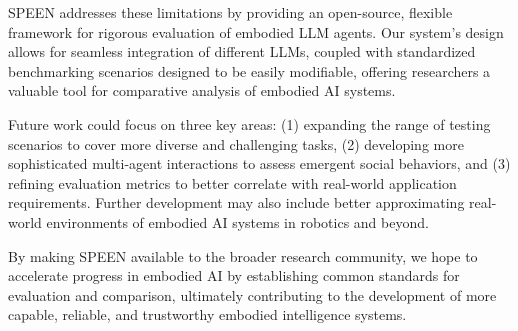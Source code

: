 \documentclass{article}
\begin{document}
SPEEN addresses these limitations by providing an open-source, flexible framework for rigorous evaluation of embodied LLM agents.
Our system's design allows for seamless integration of different LLMs, coupled with standardized benchmarking scenarios designed to be easily modifiable, offering researchers a valuable tool for comparative analysis of embodied AI systems.

Future work could focus on three key areas: (1) expanding the range of testing scenarios to cover more diverse and challenging tasks, (2) developing more sophisticated multi-agent interactions to assess emergent social behaviors, and (3) refining evaluation metrics to better correlate with real-world application requirements.
Further development may also include better approximating real-world environments of embodied AI systems in robotics and beyond.

By making SPEEN available to the broader research community, we hope to accelerate progress in embodied AI by establishing common standards for evaluation and comparison, ultimately contributing to the development of more capable, reliable, and trustworthy embodied intelligence systems.
\end{document}
